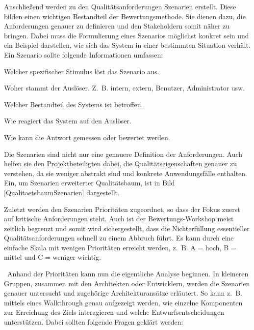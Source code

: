 
Anschließend werden zu den Qualitätsanforderungen Szenarien erstellt. Diese bilden einen wichtigen Bestandteil der Bewertungsmethode. Sie dienen dazu, die Anforderungen genauer zu definieren und den Stakeholdern somit näher zu bringen. Dabei muss die Formulierung eines Szenarios möglichst konkret sein und ein Beispiel darstellen, wie sich das System in einer bestimmten Situation verhält. Ein Szenario sollte folgende Informationen umfassen\cite{Starke2015}:

\begin{description}[leftmargin=!,labelwidth=\widthof{\bfseries Systembestandteil}]
	\item[Auslöser] Welcher spezifischer Stimulus löst das Szenario aus.
	\item[Quelle] Woher stammt der Auslöser. Z. B. intern, extern, Benutzer, Administrator usw.
	\item[Umgebung] Welcher Bestandteil des Systems ist betroffen.
	\item[Antwort] Wie reagiert das System auf den Auslöser.
	\item[Metrik] Wie kann die Antwort gemessen oder bewertet werden.
\end{description}

Die Szenarien sind nicht nur eine genauere Definition der Anforderungen. Auch helfen sie den Projektbeteiligten dabei, die Qualitätseigenschaften genauer zu verstehen, da sie weniger abstrakt sind und konkrete Anwendungsfälle enthalten. Ein, um Szenarien erweiterter Qualitätsbaum, ist in Bild \ref{QualitaetsbaumSzenarien} dargestellt.


Zuletzt werden den Szenarien Prioritäten zugeordnet, so dass der Fokus zuerst auf kritische Anforderungen steht. Auch ist der Bewertungs-Workshop meist zeitlich begrenzt und somit wird sichergestellt, dass die Nichterfüllung essentieller Qualitätsanforderungen schnell zu einem Abbruch führt. Es kann durch eine einfache Skala mit wenigen Prioritäten erreicht werden, z.~B. A = hoch, B = mittel und C = weniger wichtig.

\
Anhand der Prioritäten kann nun die eigentliche Analyse beginnen. In kleineren Gruppen, zusammen mit den Architekten oder Entwicklern, werden die Szenarien genauer untersucht und zugehörige Architekturansätze erläutert.
So kann z.~B. mittels eines Walkthrough genau aufgezeigt werden, wie einzelne Komponenten zur Erreichung des Ziels interagieren und welche Entwurfsentscheidungen unterstützen\cite{Starke2015}. Dabei sollten folgende Fragen geklärt werden: 


